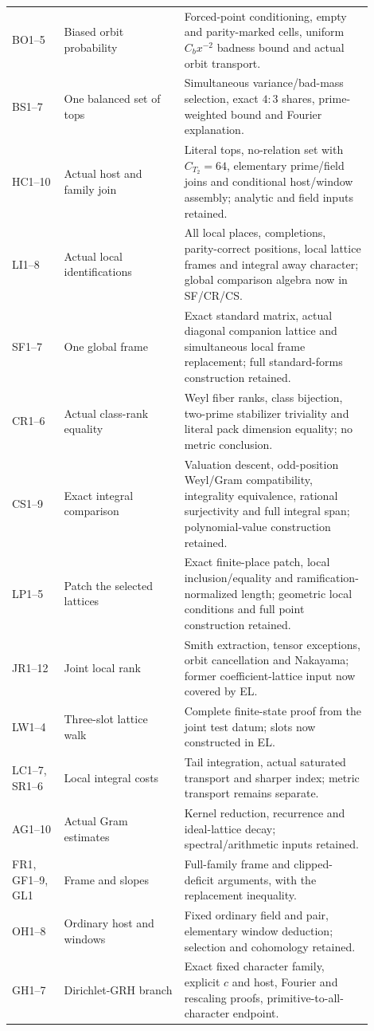 \documentclass[11pt,a4paper]{article}
\numberwithin{equation}{section}
\theoremstyle{remark}\newtheorem{remark}[theorem]{Remark}
\begin{document}
\begin{longtable}{>{\raggedright\arraybackslash}p{0.13\linewidth}>{\raggedright\arraybackslash}p{0.30\linewidth}>{\raggedright\arraybackslash}p{0.47\linewidth}}
BO1--5 & Biased orbit probability & Forced-point conditioning, empty and parity-marked cells, uniform $C_bx^{-2}$ badness bound and actual orbit transport.\\[3pt]
BS1--7 & One balanced set of tops & Simultaneous variance/bad-mass selection, exact $4:3$ shares, prime-weighted bound and Fourier explanation.\\[3pt]
HC1--10 & Actual host and family join & Literal tops, no-relation set with $C_{T_2}=64$, elementary prime/field joins and conditional host/window assembly; analytic and field inputs retained.\\[3pt]
LI1--8 & Actual local identifications & All local places, completions, parity-correct positions, local lattice frames and integral away character; global comparison algebra now in SF/CR/CS.\\[3pt]
SF1--7 & One global frame & Exact standard matrix, actual diagonal companion lattice and simultaneous local frame replacement; full standard-forms construction retained.\\[3pt]
CR1--6 & Actual class-rank equality & Weyl fiber ranks, class bijection, two-prime stabilizer triviality and literal pack dimension equality; no metric conclusion.\\[3pt]
CS1--9 & Exact integral comparison & Valuation descent, odd-position Weyl/Gram compatibility, integrality equivalence, rational surjectivity and full integral span; polynomial-value construction retained.\\[3pt]
LP1--5 & Patch the selected lattices & Exact finite-place patch, local inclusion/equality and ramification-normalized length; geometric local conditions and full point construction retained.\\[3pt]
JR1--12 & Joint local rank & Smith extraction, tensor exceptions, orbit cancellation and Nakayama; former coefficient-lattice input now covered by EL.\\[3pt]
LW1--4 & Three-slot lattice walk & Complete finite-state proof from the joint test datum; slots now constructed in EL.\\[3pt]
LC1--7, SR1--6 & Local integral costs & Tail integration, actual saturated transport and sharper index; metric transport remains separate.\\[3pt]
AG1--10 & Actual Gram estimates & Kernel reduction, recurrence and ideal-lattice decay; spectral/arithmetic inputs retained.\\[3pt]
FR1, GF1--9, GL1 & Frame and slopes & Full-family frame and clipped-deficit arguments, with the replacement inequality.\\[3pt]
OH1--8 & Ordinary host and windows & Fixed ordinary field and pair, elementary window deduction; selection and cohomology retained.\\[3pt]
GH1--7 & Dirichlet-GRH branch & Exact fixed character family, explicit $c$ and host, Fourier and rescaling proofs, primitive-to-all-character endpoint.\\
\bottomrule
\end{longtable}
\end{document}
